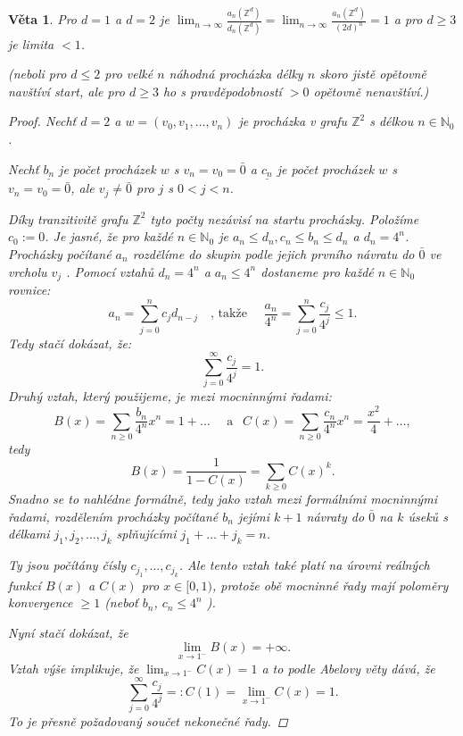 \documentclass[10pt,a4paper]{article}
\newcommand{\Z}{{\mathbb{Z}}}       %
\newcommand{\N}{{\mathbb{N}}}       %
\newtheorem*{thm}{Věta}
\begin{document}
\begin{thm} Pro $d=1$ a $d=2$ je $\displaystyle \lim_{n\to \infty} \frac{a_n(\Z^d)}{d_n(\Z^d)} = \lim_{n\to \infty} \frac{a_n(\Z^d)}{(2d)^n} = 1$
	a pro $d\geq 3$ je limita $< 1$.
	
	(neboli pro $d \leq 2$ pro velké $ n $ náhodná procházka délky $ n $ skoro jistě opětovně navštíví start, ale pro $d \geq 3$ ho s pravděpodobností $> 0$ opětovně nenavštíví.)
	\begin{proof} Nechť $d = 2$ a $w = (v_0,v_1, \ldots, v_n)$ je procházka v grafu $\Z^2$ s délkou $n \in \N_0$. 
		
		Nechť $ \underline{b_n} $ je počet procházek $ w $ s $ v_n = v_0 = \bar{0}$ a $\underline{c_n}$ je počet procházek $ w $ s $ v_n = v_0 = \bar{0} $, ale $v_j \neq \bar 0$ pro $ j $ s $0 < j < n$.
		
		Díky tranzitivitě grafu $\Z^2$ tyto počty nezávisí na startu procházky. 
		Položíme $c_0 := 0$. 
		Je jasné, že pro každé $n \in \N_0$ je $a_n \leq d_n, c_n \leq b_n \leq d_n$ a $d_n = 4^n$.
		Procházky počítané $ a_n $ rozdělíme do skupin podle jejich prvního návratu do $ \bar 0 $ ve vrcholu $ v_j $ . 
		Pomocí vztahů $d_n = 4^n$ a $a_n \leq 4^n$ dostaneme pro každé $n \in \N_0$ rovnice:
		\[
			a_n = \sum_{j=0}^{n}c_jd_{n-j} \quad \text{, takže } \quad \frac{a_n}{4^n} = \sum_{j=0}^{n}\frac{c_j}{4^j}\leq 1.
		\]Tedy stačí dokázat, že:
		\[
			\sum_{j=0}^{\infty} \frac{c_j}{4^j} = 1.
		\]
		Druhý vztah, který použijeme, je mezi mocninnými řadami:
		\[
		B(x) = \sum_{n\geq 0} \frac{b_n}{4^n}x^n= 1 + \ldots\quad \text{ a }~~ C(x) = \sum_{n\geq 0}\frac{c_n}{4^n}x^n=\frac{x^2}{4} + \ldots,
		\]
		tedy
		\[
		B(x) = \frac{1}{1-C(x)} = \sum_{k\geq0}C(x)^k.
		\]
		Snadno se to nahlédne formálně, tedy jako vztah mezi formálními mocninnými řadami, rozdělením procházky počítané $b_n$ jejími $k +1$ návraty do $ \bar 0 $ na $ k $ úseků s délkami $j_1,j_2, \ldots,j_k$ splňujícími $j_1 + \ldots + j_k = n$.
		
		Ty jsou počítány čísly $c_{j_1}, \ldots, c_{j_k}$. 
		Ale tento vztah také platí na úrovni reálných funkcí $B(x)$ a $C(x)$ pro $x \in [0, 1)$, protože obě mocninné řady mají
		poloměry konvergence $\geq 1$ \textit{(neboť $b_n$, $c_n \leq 4^n$ )}.

		Nyní stačí dokázat, že \[
		\lim_{x\to1^-} B(x) = +\infty .\]
		Vztah výše implikuje, že $\lim_{x\to1^-} C(x) = 1$ a to podle \textit{Abelovy věty} dává, že \[
			\sum_{j=0}^{\infty}\frac{c_j}{4^j} =: C(1) = \lim_{x\to 1^-}C(x) = 1.
		\]
		To je přesně požadovaný součet nekonečné řady.
		

\end{proof}
\end{thm}
\end{document}
